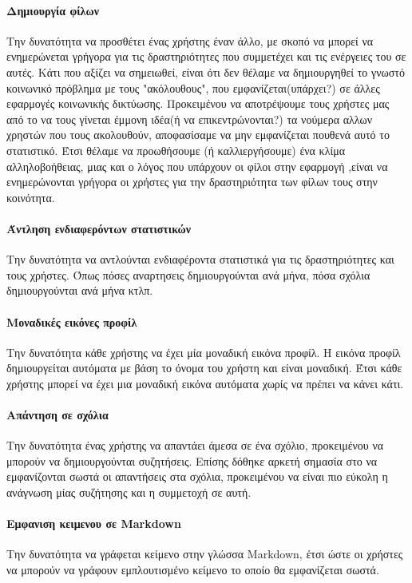 \documentclass[nonacm, language=english, language=greek]{acmart}
\newcommand{\en}[1]{\textlatin{#1}}
\begin{document}
\paragraph{Δημιουργία φίλων}
Την δυνατότητα να προσθέτει ένας χρήστης έναν άλλο, με σκοπό να μπορεί να
ενημερώνεται γρήγορα για τις δραστηριότητες που συμμετέχει και τις ενέργειες
του σε αυτές. Κάτι που αξίζει να σημειωθεί, είναι ότι δεν θέλαμε να
δημιουργηθεί το γνωστό κοινωνικό πρόβλημα με τους "ακόλουθους", που
εμφανίζεται(υπάρχει?) σε άλλες εφαρμογές κοινωνικής δικτύωσης. Προκειμένου να
αποτρέψουμε τους χρήστες μας από το να τους γίνεται έμμονη ιδέα(ή να
επικεντρώνονται?) τα νούμερα αλλων χρηστών που τους ακολουθούν, αποφασίσαμε να
μην εμφανίζεται πουθενά αυτό το στατιστικό. Έτσι θέλαμε να προωθήσουμε (ή
καλλιεργήσουμε) ένα κλίμα αλληλοβοήθειας, μιας και ο λόγος που υπάρχουν οι
φίλοι στην εφαρμογή ,είναι να ενημερώνονται γρήγορα οι χρήστες για την
δραστηριότητα των φίλων τους στην κοινότητα.

\paragraph{Άντληση ενδιαφερόντων στατιστικών}
Την δυνατότητα να αντλούνται ενδιαφέροντα στατιστικά για τις δραστηριότητες και
τους χρήστες. Όπως πόσες αναρτησεις δημιουργούνται ανά μήνα, πόσα σχόλια
δημιουργούνται ανά μήνα κτλπ.

\paragraph{Μοναδικές εικόνες προφίλ}
Την δυνατότητα κάθε χρήστης να έχει μία μοναδική εικόνα προφίλ. Η εικόνα προφίλ
δημιουργείται αυτόματα με βάση το όνομα του χρήστη και είναι μοναδική. Έτσι
κάθε χρήστης μπορεί να έχει μια μοναδική εικόνα αυτόματα χωρίς να πρέπει να
κάνει κάτι.

\paragraph{Απάντηση σε σχόλια}
Την δυνατότητα ένας χρήστης να απαντάει άμεσα σε ένα σχόλιο, προκειμένου να μπορούν να δημιουργούνται συζητήσεις. Επίσης δόθηκε αρκετή σημασία στο να εμφανίζονται σωστά οι απαντήσεις στα σχόλια, προκειμένου να είναι πιο εύκολη η ανάγνωση μίας συζήτησης και η συμμετοχή σε αυτή.

\paragraph{Εμφανιση κειμενου σε \en{Markdown}} 
Την δυνατότητα να γράφεται κείμενο στην γλώσσα \en{Markdown}, έτσι ώστε οι χρήστες να μπορούν να γράφουν εμπλουτισμένο κείμενο το οποίο θα εμφανίζεται σωστά.
\end{document}

